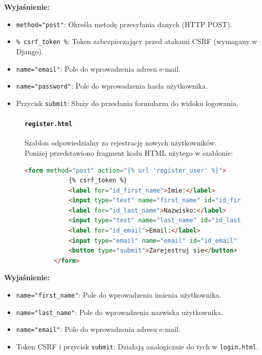\documentclass[12pt,a4paper,oneside]{article}
\theoremstyle{definition}
\numberwithin{equation}{section}
\begin{document}
\textbf{Wyjaśnienie:}
\begin{itemize}
    \item \texttt{method="post"}: Określa metodę przesyłania danych (HTTP POST).
    \item \texttt{{\% csrf\_token \%}}: Token zabezpieczający przed atakami CSRF (wymagany w Django).
    \item \texttt{name="email"}: Pole do wprowadzenia adresu e-mail.
    \item \texttt{name="password"}: Pole do wprowadzenia hasła użytkownika.
    \item Przycisk \texttt{submit}: Służy do przesłania formularza do widoku logowania.
\end{itemize}

\begin{figure}[H] %
    \paragraph{\texttt{register.html}}
    \label{sec:register_template}
    Szablon odpowiedzialny za rejestrację nowych użytkowników. Poniżej przedstawiono fragment kodu HTML użytego w szablonie:
    \begin{lstlisting}[language=HTML, caption=Szablon register.html]
        <form method="post" action="{% url 'register_user' %}">
            {% csrf_token %}
            <label for="id_first_name">Imie:</label>
            <input type="text" name="first_name" id="id_first_name" required>
            <label for="id_last_name">Nazwisko:</label>
            <input type="text" name="last_name" id="id_last_name" required>
            <label for="id_email">Email:</label>
            <input type="email" name="email" id="id_email" required>
            <button type="submit">Zarejestruj sie</button>
        </form>
    \end{lstlisting}
    \end{figure}

\textbf{Wyjaśnienie:}
\begin{itemize}
    \item \texttt{name="first\_name"}: Pole do wprowadzenia imienia użytkownika.
    \item \texttt{name="last\_name"}: Pole do wprowadzenia nazwiska użytkownika.
    \item \texttt{name="email"}: Pole do wprowadzenia adresu e-mail.
    \item Token CSRF i przycisk \texttt{submit}: Działają analogicznie do tych w \texttt{login.html}.
\end{itemize}
\end{document}
